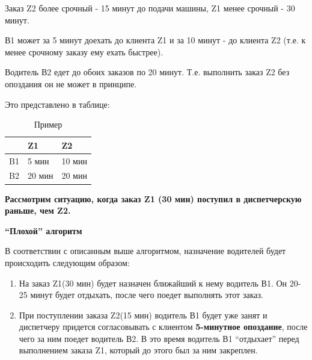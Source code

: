     	Заказ Z2 более срочный - 15 минут до подачи машины, Z1 менее срочный - 30 минут.

		В1 может за 5 минут доехать до клиента Z1 и за 10 минут - до клиента Z2 (т.е. к менее срочному заказу ему ехать быстрее).

		Водитель В2 едет до обоих заказов по 20 минут. Т.е. выполнить заказ Z2 без опоздания он не может в принципе.

		Это представлено в таблице:

		\begin{table}[htb]
	        \begin{center}
	        \caption{Пример}
	        \label{appendices_example_table}
	        \setlength{\extrarowheight}{2mm}
	        \begin{tabular}{|p{2cm}|p{2cm}|p{2cm}|}
	           \hline   \textbf{ }&\textbf{Z1}&\textbf{Z2} \\ [2mm]

	           \hline B1 & 5 мин & 10 мин\\ [2mm]

	           \hline B2 & 20 мин & 20 мин\\ [2mm]    

	           \hline
	        \end{tabular}
	        \end{center}
      	\end{table}

      	\textbf{Рассмотрим ситуацию, когда заказ Z1 (30 мин) поступил в диспетчерскую раньше, чем Z2.}

		\textbf{“Плохой” алгоритм}

		В соответствии с описанным выше алгоритмом, назначение водителей будет происходить следующим образом:
		\begin{enumerate}

			\item{На заказ Z1(30 мин) будет назначен ближайший к нему водитель В1. Он 20-25 минут будет отдыхать, после чего поедет выполнять этот заказ.}

			\item{При поступлении заказа Z2(15 мин) водитель В1 будет уже занят и диспетчеру придется согласовывать с клиентом \textbf{5-минутное опоздание}, после чего за ним поедет водитель В2. В это время водитель В1 “отдыхает” перед выполнением заказа Z1, который до этого был за ним закреплен.}

		\end{enumerate}

